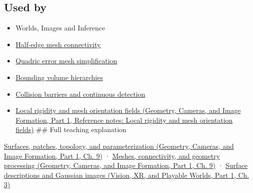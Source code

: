 \subsection{Used by}\label{appendix-fab348609369-used-by}

\hypertarget{appendix-fab348609369-used-by}{}

\begin{itemize}
\item
  {Worlds, Images and Inference}
\item
  \hyperref[appendix-1aea26b2307f]{Half-edge mesh connectivity}
\item
  \hyperref[appendix-1dd4ad54ca57]{Quadric error mesh simplification}
\item
  \hyperref[appendix-0b426c47dd78]{Bounding volume hierarchies}
\item
  \hyperref[appendix-a9ba01fa72a6]{Collision barriers and continuous detection}
\item
  \href{../03-Geometry-Cameras-and-Image-Formation-P01/main.pdf\#appendix-7107009c505b}{Local rigidity and mesh orientation fields (Geometry, Cameras, and Image Formation, Part 1, Reference notes: Local rigidity and mesh orientation fields)} \#\# Full teaching explanation
\end{itemize}

\href{../03-Geometry-Cameras-and-Image-Formation-P01/main.pdf\#03-visual-computing-i-ch002-surfaces-patches-topology-and-parameterization}{Surfaces, patches, topology, and parameterization (Geometry, Cameras, and Image Formation, Part 1, Ch. 9)} · \href{../03-Geometry-Cameras-and-Image-Formation-P01/main.pdf\#03-visual-computing-i-ch002-meshes-connectivity-and-geometry-processing}{Meshes, connectivity, and geometry processing (Geometry, Cameras, and Image Formation, Part 1, Ch. 9)} · \href{../07-Vision-XR-and-Playable-Worlds-P01/main.pdf\#04-visual-computing-ii-ch032-surface-descriptions-and-gaussian-images}{Surface descriptions and Gaussian images (Vision, XR, and Playable Worlds, Part 1, Ch. 3)}
